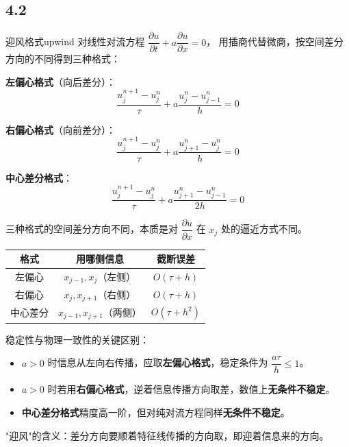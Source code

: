 \subsection{4.2}
\begin{definition}{迎风格式}{upwind}
对线性对流方程 $\dfrac{\partial u}{\partial t} + a\dfrac{\partial u}{\partial x} = 0$，
用插商代替微商，按空间差分方向的不同得到三种格式：

\textbf{左偏心格式}（向后差分）：
\[
\frac{u_j^{n+1} - u_j^n}{\tau} + a\frac{u_j^n - u_{j-1}^n}{h} = 0
\]

\textbf{右偏心格式}（向前差分）：
\[
\frac{u_j^{n+1} - u_j^n}{\tau} + a\frac{u_{j+1}^n - u_j^n}{h} = 0
\]

\textbf{中心差分格式}：
\[
\frac{u_j^{n+1} - u_j^n}{\tau} + a\frac{u_{j+1}^n - u_{j-1}^n}{2h} = 0
\]
\end{definition}
\begin{note}
三种格式的空间差分方向不同，本质是对 $\dfrac{\partial u}{\partial x}$ 在 $x_j$ 处的逼近方式不同。

\begin{center}
\begin{tabular}{ccc}
\hline
格式 & 用哪侧信息 & 截断误差 \\
\hline
左偏心 & $x_{j-1}, x_j$（左侧） & $O(\tau + h)$ \\
右偏心 & $x_j, x_{j+1}$（右侧） & $O(\tau + h)$ \\
中心差分 & $x_{j-1}, x_{j+1}$（两侧） & $O(\tau + h^2)$ \\
\hline
\end{tabular}
\end{center}

稳定性与物理一致性的关键区别：
\begin{itemize}
    \item $a > 0$ 时信息从左向右传播，应取\textbf{左偏心格式}，稳定条件为 $\dfrac{a\tau}{h} \leq 1$。
    \item $a > 0$ 时若用\textbf{右偏心格式}，逆着信息传播方向取差，数值上\textbf{无条件不稳定}。
    \item \textbf{中心差分格式}精度高一阶，但对纯对流方程同样\textbf{无条件不稳定}。
\end{itemize}

"迎风"的含义：差分方向要顺着特征线传播的方向取，即迎着信息来的方向。
\end{note}
